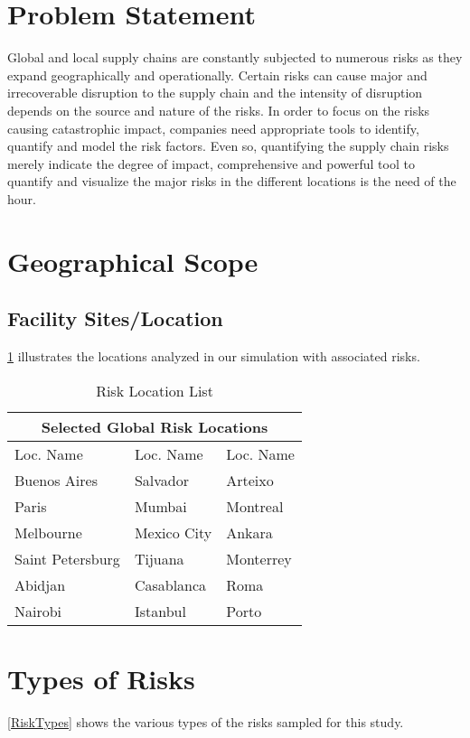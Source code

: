 \documentclass[conference]{IEEEtran}
\begin{document}
\section{Problem Statement}
Global and local supply chains are constantly subjected to numerous risks as they expand geographically and operationally. Certain risks can cause major and irrecoverable disruption to the supply chain and the intensity of disruption depends on the source and nature of the risks. In order to focus on the risks causing catastrophic impact, companies need appropriate tools to identify, quantify and model the risk factors. Even so, quantifying the supply chain risks merely indicate the degree of impact, comprehensive and powerful tool to quantify and visualize the major risks in the different locations is the need of the hour. 

\section{Geographical Scope}
\subsection{Facility Sites/Location}
\ref{RiskLocations} illustrates the locations analyzed in our simulation with associated risks.

\begin{table}[h!]
\centering
\caption{Risk Location List}
\label{RiskLocations}
\begin{tabular}{|p{2cm}||p{2cm}|p{2cm}|}
\hline
\multicolumn{3}{|c|}{Selected Global Risk Locations} \\
\hline
Loc. Name & Loc. Name & Loc. Name \\
\hline
Buenos Aires & Salvador  & Arteixo \\
Paris & Mumbai & Montreal \\
Melbourne & Mexico City & Ankara \\
Saint Petersburg & Tijuana & Monterrey \\
Abidjan & Casablanca & Roma \\
Nairobi & Istanbul  & Porto \\
\hline
\end{tabular}
\end{table}

\section{Types of Risks}
\ref{RiskTypes} shows the various types of the risks sampled for this study.
\end{document}
